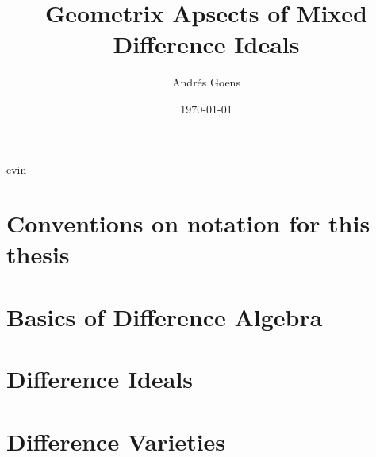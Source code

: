 \documentclass{article}
\title{Geometrix Apsects of Mixed Difference Ideals}
\author{Andr\'{e}s Goens}
\date{\today}
\theoremstyle{plain}
\theoremstyle{definition}
\begin{document}
\setlength{\parindent}{1.5em}

\maketitle

\clearpage

\tableofcontents

\clearpage 
evin
\section*{Conventions on notation for this thesis} 


\section{Basics of Difference Algebra}


\section{Difference Ideals}

\section{Difference Varieties}

\clearpage 


\clearpage
\printindex
\end{document}
